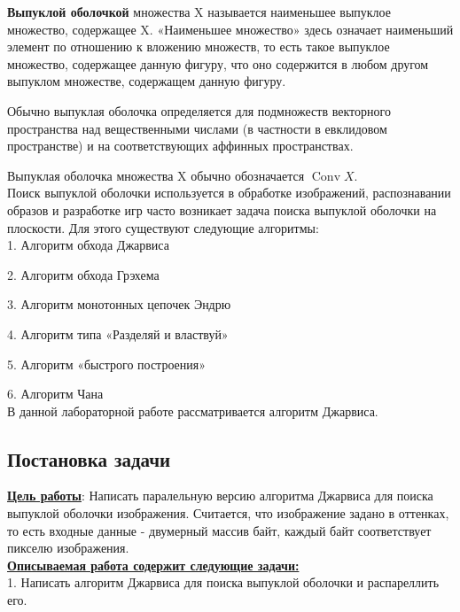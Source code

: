 \documentclass[a4paper, 12pt]{article}
\begin{document}
\textbf{Выпуклой оболочкой} множества {X} называется наименьшее выпуклое множество, содержащее {X}. «Наименьшее множество» здесь означает наименьший элемент по отношению к вложению множеств, то есть такое выпуклое множество, содержащее данную фигуру, что оно содержится в любом другом выпуклом множестве, содержащем данную фигуру.

Обычно выпуклая оболочка определяется для подмножеств векторного пространства над вещественными числами (в частности в евклидовом пространстве) и на соответствующих аффинных пространствах.

Выпуклая оболочка множества {X} обычно обозначается $\operatorname {Conv}X$.\\[2mm]

Поиск выпуклой оболочки используется в обработке изображений, распознавании образов и разработке игр часто возникает задача поиска выпуклой оболочки на плоскости. Для этого существуют следующие алгоритмы: \\[2mm]

1. Алгоритм обхода Джарвиса

2. Алгоритм обхода Грэхема

3. Алгоритм монотонных цепочек Эндрю

4. Алгоритм типа «Разделяй и властвуй»

5. Алгоритм «быстрого построения»

6. Алгоритм Чана\\[2mm]

В данной лабораторной работе рассматривается алгоритм Джарвиса.

\newpage
\begin{center}
    \section{Постановка задачи}
\end{center}

\underline{\textbf{Цель работы}}: Написать паралельную версию алгоритма Джарвиса для поиска выпуклой оболочки изображения. Считается, что изображение задано в оттенках, то есть входные данные - двумерный массив байт, каждый байт соответствует пикселю изображения.\\[2mm]


\underline{\textbf{Описываемая работа содержит следующие задачи:}}\\[1mm]

1. Написать алгоритм Джарвиса для поиска выпуклой оболочки и распареллить его.
\end{document}
